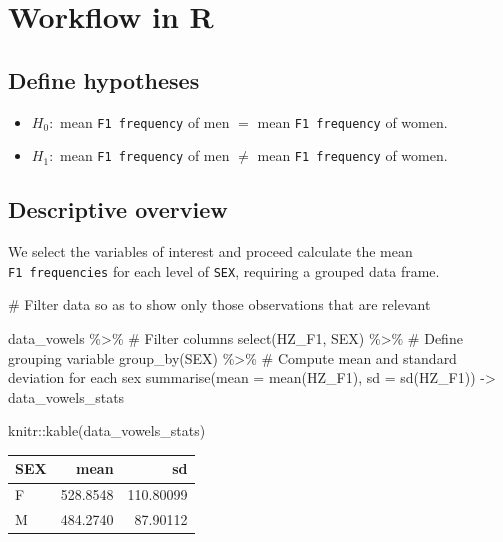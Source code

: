 \documentclass[
  11pt,
  letterpaper,
  DIV=11,
  numbers=noendperiod]{scrreprt}
\newenvironment{Shaded}{\begin{snugshade}}{\end{snugshade}}
\newcommand{\AttributeTok}[1]{\textcolor[rgb]{0.40,0.45,0.13}{#1}}
\newcommand{\CommentTok}[1]{\textcolor[rgb]{0.37,0.37,0.37}{#1}}
\newcommand{\FunctionTok}[1]{\textcolor[rgb]{0.28,0.35,0.67}{#1}}
\newcommand{\NormalTok}[1]{\textcolor[rgb]{0.00,0.23,0.31}{#1}}
\newcommand{\OtherTok}[1]{\textcolor[rgb]{0.00,0.23,0.31}{#1}}
\newcommand{\SpecialCharTok}[1]{\textcolor[rgb]{0.37,0.37,0.37}{#1}}
\begin{document}
\section{Workflow in R}\label{workflow-in-r-1}

\subsection{Define hypotheses}\label{define-hypotheses-1}

\begin{itemize}
\item
  \(H_0:\) mean \texttt{F1\ frequency} of men \(=\) mean
  \texttt{F1\ frequency} of women.
\item
  \(H_1:\) mean \texttt{F1\ frequency} of men \(\ne\) mean
  \texttt{F1\ frequency} of women.
\end{itemize}

\subsection{Descriptive overview}\label{descriptive-overview}

We select the variables of interest and proceed calculate the mean
\texttt{F1\ frequencies} for each level of \texttt{SEX}, requiring a
grouped data frame.

\begin{Shaded}
\begin{Highlighting}[]
\CommentTok{\# Filter data so as to show only those observations that are relevant}

\NormalTok{data\_vowels }\SpecialCharTok{\%\textgreater{}\%} 
  \CommentTok{\# Filter columns}
  \FunctionTok{select}\NormalTok{(HZ\_F1, SEX) }\SpecialCharTok{\%\textgreater{}\%}
    \CommentTok{\# Define grouping variable}
    \FunctionTok{group\_by}\NormalTok{(SEX) }\SpecialCharTok{\%\textgreater{}\%} 
      \CommentTok{\# Compute mean and standard deviation for each sex}
      \FunctionTok{summarise}\NormalTok{(}\AttributeTok{mean =} \FunctionTok{mean}\NormalTok{(HZ\_F1),}
                \AttributeTok{sd =} \FunctionTok{sd}\NormalTok{(HZ\_F1)) }\OtherTok{{-}\textgreater{}}\NormalTok{ data\_vowels\_stats}

\NormalTok{knitr}\SpecialCharTok{::}\FunctionTok{kable}\NormalTok{(data\_vowels\_stats)}
\end{Highlighting}
\end{Shaded}

\begin{longtable}[]{@{}lrr@{}}
\toprule\noalign{}
SEX & mean & sd \\
\midrule\noalign{}
\endhead
\bottomrule\noalign{}
\endlastfoot
F & 528.8548 & 110.80099 \\
M & 484.2740 & 87.90112 \\
\end{longtable}
\end{document}
